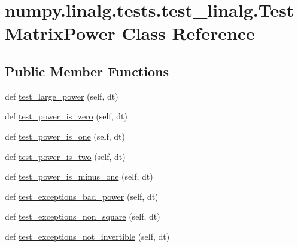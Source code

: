 \hypertarget{classnumpy_1_1linalg_1_1tests_1_1test__linalg_1_1TestMatrixPower}{}\section{numpy.\+linalg.\+tests.\+test\+\_\+linalg.\+Test\+Matrix\+Power Class Reference}
\label{classnumpy_1_1linalg_1_1tests_1_1test__linalg_1_1TestMatrixPower}
\subsection*{Public Member Functions}
\begin{DoxyCompactItemize}
\item 
def \hyperlink{classnumpy_1_1linalg_1_1tests_1_1test__linalg_1_1TestMatrixPower_a3f47d9d7f10f1c2e498b2697e8854a70}{test\+\_\+large\+\_\+power} (self, dt)
\item 
def \hyperlink{classnumpy_1_1linalg_1_1tests_1_1test__linalg_1_1TestMatrixPower_a7d14e79891ef5a963f52b8118b7b8b27}{test\+\_\+power\+\_\+is\+\_\+zero} (self, dt)
\item 
def \hyperlink{classnumpy_1_1linalg_1_1tests_1_1test__linalg_1_1TestMatrixPower_a18a0dc1455d1ef1ad63254a601d26fb0}{test\+\_\+power\+\_\+is\+\_\+one} (self, dt)
\item 
def \hyperlink{classnumpy_1_1linalg_1_1tests_1_1test__linalg_1_1TestMatrixPower_aa4bb6a9a0dd83fc175342a1a45a01783}{test\+\_\+power\+\_\+is\+\_\+two} (self, dt)
\item 
def \hyperlink{classnumpy_1_1linalg_1_1tests_1_1test__linalg_1_1TestMatrixPower_a90d92758967a759513d45863e00f2659}{test\+\_\+power\+\_\+is\+\_\+minus\+\_\+one} (self, dt)
\item 
def \hyperlink{classnumpy_1_1linalg_1_1tests_1_1test__linalg_1_1TestMatrixPower_aa7cd07cd3fb45a3b3bc982cb2dd81531}{test\+\_\+exceptions\+\_\+bad\+\_\+power} (self, dt)
\item 
def \hyperlink{classnumpy_1_1linalg_1_1tests_1_1test__linalg_1_1TestMatrixPower_a32b31f24afaee66466fe2661c523206e}{test\+\_\+exceptions\+\_\+non\+\_\+square} (self, dt)
\item 
def \hyperlink{classnumpy_1_1linalg_1_1tests_1_1test__linalg_1_1TestMatrixPower_a6add15284dbe3d4b48796edcffd1b245}{test\+\_\+exceptions\+\_\+not\+\_\+invertible} (self, dt)
\end{DoxyCompactItemize}
